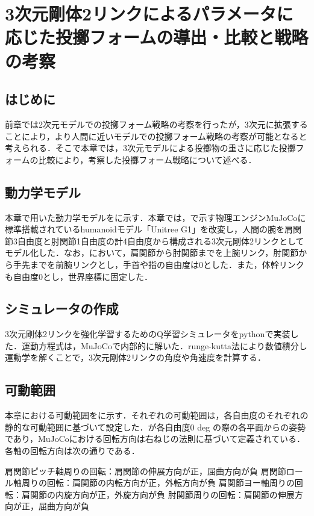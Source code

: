 \chapter[3次元剛体2リンクによるパラメータに応じた投擲フォームの導出・比較と戦略の考察]{3次元剛体2リンクによるパラメータに応じた投擲フォームの導出・比較と戦略の考察}

\section{はじめに}
前章では2次元モデルでの投擲フォーム戦略の考察を行ったが，3次元に拡張することにより，より人間に近いモデルでの投擲フォーム戦略の考察が可能となると考えられる．そこで本章では，3次元モデルによる投擲物の重さに応じた投擲フォームの比較により，考察した投擲フォーム戦略について述べる．
\section{動力学モデル}
本章で用いた動力学モデルをに示す．本章では，で示す物理エンジンMuJoCo\cite{mujoco}\cite{mujoco2}に標準搭載されているhumanoidモデル「Unitree G1」\cite{unitreeg1}を改変し，人間の腕を肩関節3自由度と肘関節1自由度の計4自由度から構成される3次元剛体2リンクとしてモデル化した．なお，において，肩関節から肘関節までを上腕リンク，肘関節から手先までを前腕リンクとし，手首や指の自由度は0とした．また，体幹リンクも自由度0とし，世界座標に固定した．

\section{シミュレータの作成}
3次元剛体2リンクを強化学習するためのQ学習シミュレータをpythonで実装した．運動方程式は，MuJoCoで内部的に解いた．runge-kutta法により数値積分し運動学を解くことで，3次元剛体2リンクの角度や角速度を計算する．
\section{可動範囲}
本章における可動範囲をに示す．それぞれの可動範囲は，各自由度のそれぞれの静的な可動範囲\cite{range}に基づいて設定した．が各自由度0 deg の際の各平面からの姿勢であり，MuJoCoにおける回転方向は右ねじの法則に基づいて定義されている．各軸の回転方向は次の通りである．

肩関節ピッチ軸周りの回転：肩関節の伸展方向が正，屈曲方向が負
肩関節ロール軸周りの回転：肩関節の内転方向が正，外転方向が負
肩関節ヨー軸周りの回転：肩関節の内旋方向が正，外旋方向が負
肘関節周りの回転：肩関節の伸展方向が正，屈曲方向が負

